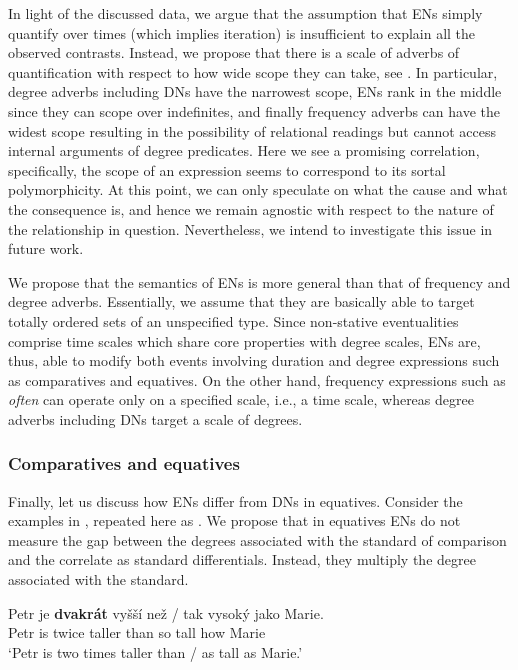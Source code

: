 \documentclass[output=paper,
modfonts,
hidelinks,
newtxmath
]{langscibook}
\begin{document}
\noindent In light of the discussed data, we argue that the assumption that ENs simply quantify over times (which implies iteration) is insufficient to explain all the observed contrasts. Instead, we propose that there is a scale of adverbs of quantification with respect to how wide scope they can take, see . In particular, degree adverbs including DNs have the narrowest scope, ENs rank in the middle since they can scope over indefinites, and finally frequency adverbs can have the widest scope resulting in the possibility of relational readings but cannot access internal arguments of degree predicates. Here we see a promising correlation, specifically, the scope of an expression seems to correspond to its sortal polymorphicity. At this point, we can only speculate on what the cause and what the consequence is, and hence we remain agnostic with respect to the nature of the relationship in question. Nevertheless, we intend to investigate this issue in future work.


We propose that the semantics of ENs is more general than that of frequency and degree adverbs. Essentially, we assume that they are basically able to target totally ordered sets of an unspecified type. Since non-stative eventualities comprise time scales which share core properties with degree scales, ENs are, thus, able to modify both events involving duration and degree expressions such as comparatives and equatives. On the other hand, frequency expressions such as \textit{often} can operate only on a specified scale, i.e., a time scale, whereas degree adverbs including DNs target a scale of degrees.

\subsubsection{Comparatives and equatives}\label{comparatives-and-equatives}

Finally, let us discuss how ENs differ from DNs in equatives. Consider the examples in , repeated here as . We propose that in equatives ENs do not measure the gap between the degrees associated with the standard of comparison and the correlate as standard differentials. Instead, they multiply the degree associated with the standard.

\ea\label{comp-eq-dvakrat} \gll Petr je \textbf{dvakrát} vyšší než / tak vysoký jako Marie.\\
Petr is twice taller than {} so tall how Marie\\
\glt `Petr is two times taller than / as tall as Marie.'
\z
\end{document}
